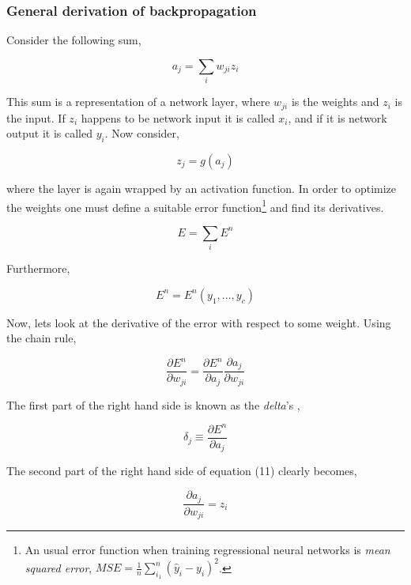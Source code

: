\documentclass[12pt, letterpaper]{amsart}%
\begin{document}
\subsubsection{General derivation of backpropagation}
Consider the following sum,

\begin{equation}
    a_j = \sum_i w_{ji}z_i
\end{equation}

This sum is a representation of a network layer, where $w_{ji}$ is the weights and $z_i$ is the input. If $z_i$ happens to be network input it is called $x_i$, and if it is network output it is called $y_i$. Now consider,

\begin{equation}
    z_j = g(a_j)
\end{equation}

where the layer is again wrapped by an activation function. In order to optimize the weights one must define a suitable error function\footnote{An usual error function when training regressional neural networks is \textit{mean squared error}, $MSE = \frac{1}{n} \sum_{i_1}^n (\hat{y}_i - y_i)^2$.} and find its derivatives.

\begin{equation}
    E = \sum_i E^n
\end{equation}

Furthermore, 

\begin{equation}
    E^n = E^n(y_1,...,y_c)
\end{equation}

Now, lets look at the derivative of the error with respect to some weight. Using the chain rule,

\begin{equation}
    \frac{\partial E^n}{\partial w_{ji}} = \frac{\partial E^n}{\partial a_j} \frac{\partial a_j}{\partial w_{ji}}
\end{equation}

The first part of the right hand side is known as the \textit{delta}'s ,

\begin{equation}
    \delta_j \equiv \frac{\partial E^n}{\partial a_j}
\end{equation}

The second part of the right hand side of equation (11) clearly becomes,

\begin{equation}
    \frac{\partial a_j}{\partial w_{ji}} = z_i
\end{equation}
\end{document}
